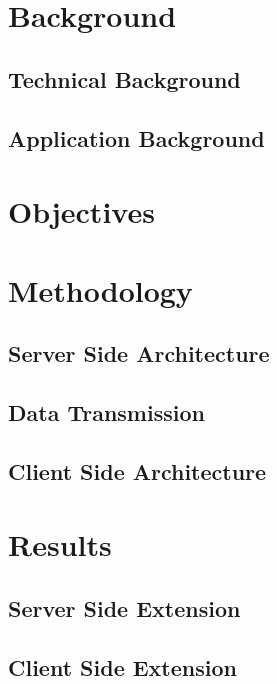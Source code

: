 \documentclass[12pt]{asu}
\begin{document}
	\chapter[Background]{\centering Background} \label{bkgrnd}
				\section{Technical Background}
				 \label{bkgrnd_technical}
				\section{Application Background}
				 \label{bkgrnd_application}

	\chapter[Objectives]{\centering Objectives} \label{objectives}
	 \label{objectives}

	\chapter[Methodology]{\centering Methodology} \label{methods}
	 \label{methods_intro}
		\section{Server Side Architecture}
		 \label{methods_server_side}
		\section{Data Transmission}
		 \label{methods_data_transmission}
		\section{Client Side Architecture}
		 \label{methods_client_side}

	\chapter[Results]{\centering Results} \label{results}
	 \label{results_intro}
		\section{Server Side Extension}
		 \label{results_server}
		\section{Client Side Extension}
		 \label{results_client}

	\newpage

  
	

	\appendix
	\fontsize{11pt}{26pt}\selectfont

	\newpage
		
\end{document}
